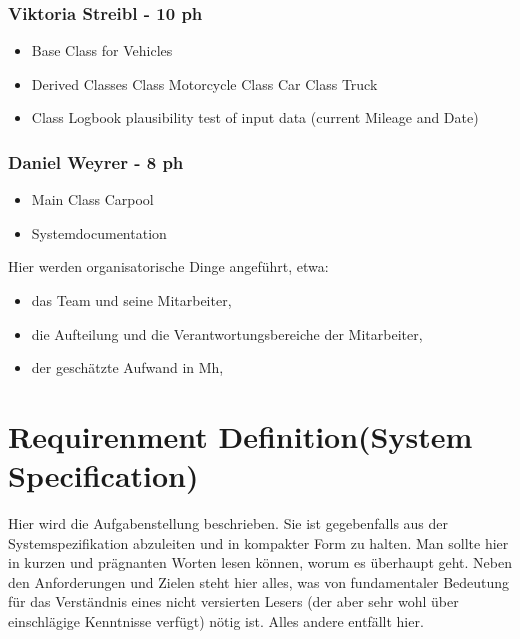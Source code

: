 \subsubsection{Viktoria Streibl - 10 ph}
\begin{itemize}
	\item Base Class for Vehicles
	\item Derived Classes
		\subitem Class Motorcycle
		\subitem Class Car
		\subitem Class Truck
	\item Class Logbook
		\subitem plausibility test of input data (current Mileage and Date)
\end{itemize}


\subsubsection{Daniel Weyrer - 8 ph}
\begin{itemize}
	\item Main Class Carpool
	\item Systemdocumentation
\end{itemize}


Hier werden organisatorische Dinge angeführt, etwa:
\begin{itemize}
	\item das Team und seine Mitarbeiter,
	\item die Aufteilung und die Verantwortungsbereiche der Mitarbeiter,
	\item der geschätzte Aufwand in Mh,
\end{itemize}




\section{Requirenment Definition(System Specification)}

Hier wird die Aufgabenstellung beschrieben. Sie ist gegebenfalls aus der Systemspezifikation abzuleiten und in kompakter Form zu halten. Man sollte hier in kurzen und
prägnanten Worten lesen können, worum es überhaupt geht. Neben den Anforderungen und Zielen steht hier alles, was von fundamentaler Bedeutung für das Verständnis
eines nicht versierten Lesers (der aber sehr wohl über einschlägige Kenntnisse verfügt) nötig ist. Alles andere entfällt hier.

